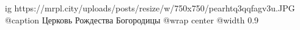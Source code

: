  
 
 
 
 

\ifcmt
  ig https://mrpl.city/uploads/posts/resize/w/750x750/pearhtq3qqfagv3u.JPG
	@caption Церковь Рождества Богородицы
  @wrap center
  @width 0.9
\fi
